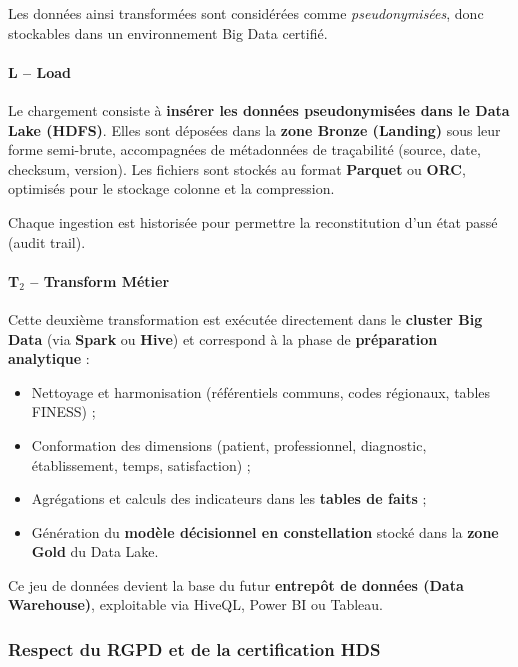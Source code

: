 \documentclass[12pt,a4paper]{article}
\begin{document}
Les données ainsi transformées sont considérées comme \textit{pseudonymisées}, donc stockables dans un environnement Big Data certifié.

\paragraph{L – Load}

Le chargement consiste à \textbf{insérer les données pseudonymisées dans le Data Lake (HDFS)}.
Elles sont déposées dans la \textbf{zone Bronze (Landing)} sous leur forme semi-brute, accompagnées de métadonnées de traçabilité (source, date, checksum, version).
Les fichiers sont stockés au format \textbf{Parquet} ou \textbf{ORC}, optimisés pour le stockage colonne et la compression.

Chaque ingestion est historisée pour permettre la reconstitution d'un état passé (audit trail).

\paragraph{T$_{2}$ -- Transform Métier}

Cette deuxième transformation est exécutée directement dans le \textbf{cluster Big Data} (via \textbf{Spark} ou \textbf{Hive}) et correspond à la phase de \textbf{préparation analytique} :

\begin{itemize}[leftmargin=*]
    \item Nettoyage et harmonisation (référentiels communs, codes régionaux, tables FINESS) ;
    \item Conformation des dimensions (patient, professionnel, diagnostic, établissement, temps, satisfaction) ;
    \item Agrégations et calculs des indicateurs dans les \textbf{tables de faits} ;
    \item Génération du \textbf{modèle décisionnel en constellation} stocké dans la \textbf{zone Gold} du Data Lake.
\end{itemize}

Ce jeu de données devient la base du futur \textbf{entrepôt de données (Data Warehouse)}, exploitable via HiveQL, Power BI ou Tableau.

\subsubsection{Respect du RGPD et de la certification HDS}
\end{document}
